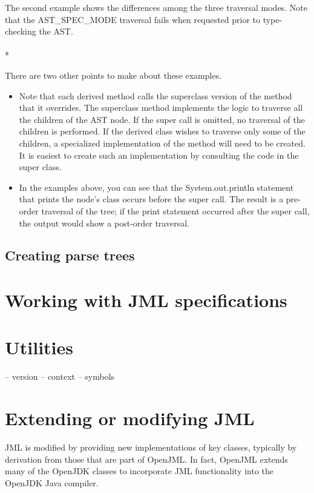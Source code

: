 \documentclass{report}%
\newcommand{\boxspace}{\vspace*{6pt}}
\newlength{\savedrule}
\newlength{\thickrule}
\newlength{\framedwidth}
\newlength{\thickframedwidth}
\newcommand{\boxedinputc}[2]{\boxspace \\ \fbox{\begin{minipage}{1.0\framedwidth}{\tt }\end{minipage}} \setlength{\fboxrule}{\thickrule} \fbox{\begin{minipage}{1.0\thickframedwidth}{\tt }\end{minipage}} \setlength{\fboxrule}{\savedrule} \boxspace\\*}
\newcommand{\source}{../../demos}
\newcommand{\demo}[1]{\boxedinputc{\source/#1.java}{\source/#1.txt}}
\begin{document}
The second example shows the differences among the three traversal modes. Note that the AST\_SPEC\_MODE traversal fails when requested prior to type-checking the AST.
\demo{DemoWalkTree2}

There are two other points to make about these examples.
\begin{itemize}
\item Note that each derived method calls the superclass version of the method that it overrides. The superclass method implements the logic to traverse all the children of the AST node. If the super call is omitted, no traversal of the children is performed. If the derived class wishes to traverse only some of the children, a specialized implementation of the method will need to be created.
It is easiest to create such an implementation by consulting the code in the super class.
\item In the examples above, you can see that the System.out.println statement that prints the node's class occurs before the super call. The result is a pre-order traversal of the tree; if the print statement occurred after the super call, the output would show a post-order traversal.
\end{itemize}


\subsection{Creating parse trees}

\section{Working with JML specifications}

\section{Utilities}

-- version
-- context
-- symbols

\section{Extending or modifying JML}
JML is modified by providing new implementations of key classes, typically by derivation from those that are part of OpenJML.
In fact, OpenJML extends many of the OpenJDK classes to incorporate JML functionality into the OpenJDK Java compiler.
\end{document}
